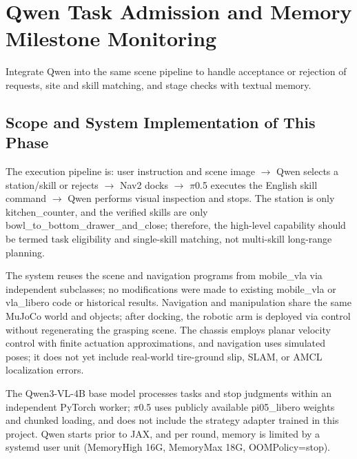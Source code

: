 

\FloatBarrier

\section{Qwen Task Admission and Memory Milestone Monitoring}

\label{stage:s16}

Integrate Qwen into the same scene pipeline to handle acceptance or rejection of requests, site and skill matching, and stage checks with textual memory.

\subsection{Scope and System Implementation of This Phase}\label{s16-detail-1}

The execution pipeline is: user instruction and scene image \(\rightarrow\) Qwen selects a station/skill or rejects \(\rightarrow\) Nav2 docks \(\rightarrow\) \(\pi\)0.5 executes the English skill command \(\rightarrow\) Qwen performs visual inspection and stops. The station is only kitchen\_counter, and the verified skills are only bowl\_to\_bottom\_drawer\_and\_close; therefore, the high-level capability should be termed task eligibility and single-skill matching, not multi-skill long-range planning.

The system reuses the scene and navigation programs from mobile\_vla via independent subclasses; no modifications were made to existing mobile\_vla or vla\_libero code or historical results. Navigation and manipulation share the same MuJoCo world and objects; after docking, the robotic arm is deployed via control without regenerating the grasping scene. The chassis employs planar velocity control with finite actuation approximations, and navigation uses simulated poses; it does not yet include real-world tire-ground slip, SLAM, or AMCL localization errors.

The Qwen3-VL-4B base model processes tasks and stop judgments within an independent PyTorch worker; \(\pi\)0.5 uses publicly available pi05\_libero weights and chunked loading, and does not include the strategy adapter trained in this project. Qwen starts prior to JAX, and per round, memory is limited by a systemd user unit (MemoryHigh 16G, MemoryMax 18G, OOMPolicy=stop).

